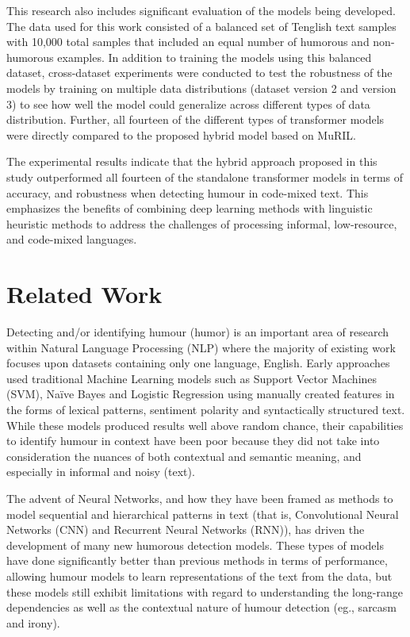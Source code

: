 \documentclass[conference]{IEEEtran}
\begin{document}
This research also includes significant evaluation of the models being developed. The data used for this work consisted of a balanced set of Tenglish text samples with 10,000 total samples that included an equal number of humorous and non-humorous examples. In addition to training the models using this balanced dataset, cross-dataset experiments were conducted to test the robustness of the models by training on multiple data distributions (dataset version 2 and version 3) to see how well the model could generalize across different types of data distribution. Further, all fourteen of the different types of transformer models were directly compared to the proposed hybrid model based on MuRIL.

The experimental results indicate that the hybrid approach proposed in this study outperformed all fourteen of the standalone transformer models in terms of accuracy, and robustness when detecting humour in code-mixed text. This emphasizes the benefits of combining deep learning methods with linguistic heuristic methods to address the challenges of processing informal, low-resource, and code-mixed languages.

\section{Related Work}

Detecting and/or identifying humour (humor) is an important area of research within Natural Language Processing (NLP) where the majority of existing work focuses upon datasets containing only one language, English. Early approaches used traditional Machine Learning models such as Support Vector Machines (SVM), Naïve Bayes and Logistic Regression using manually created features in the forms of lexical patterns, sentiment polarity and syntactically structured text. While these models produced results well above random chance, their capabilities to identify humour in context have been poor because they did not take into consideration the nuances of both contextual and semantic meaning, and especially in informal and noisy (text).

The advent of Neural Networks, and how they have been framed as methods to model sequential and hierarchical patterns in text (that is, Convolutional Neural Networks (CNN) and Recurrent Neural Networks (RNN)), has driven the development of many new humorous detection models. These types of models have done significantly better than previous methods in terms of performance, allowing humour models to learn representations of the text from the data, but these models still exhibit limitations with regard to understanding the long-range dependencies as well as the contextual nature of humour detection (eg., sarcasm and irony).
\end{document}
